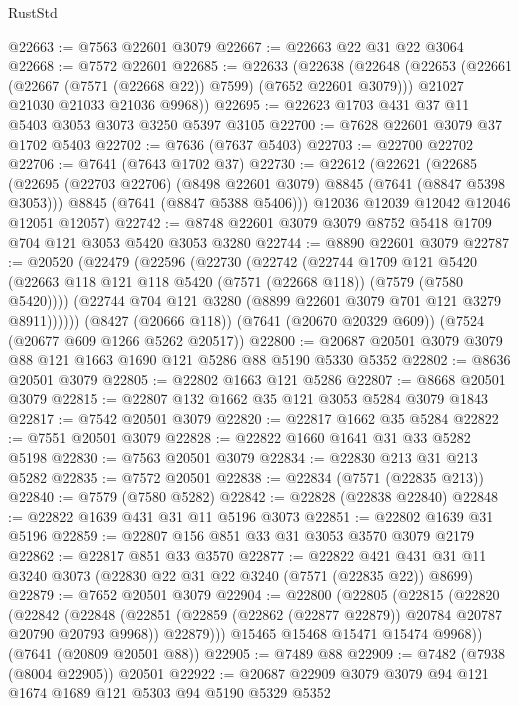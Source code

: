 \begin{lexlean}{RustStd}
\begin{coremodule}
{\begin{coremodule}
{{{{{{{{{{{{{{{{{{{{{{{{{{{{{{{{@22663 := @7563 @22601 @3079
@22667 := @22663 @22 @31 @22 @3064
@22668 := @7572 @22601
@22685 := @22633
    (@22638
      (@22648
        (@22653 (@22661 (@22667 (@7571 (@22668 @22)) @7599) (@7652 @22601 @3079)))
        @21027
        @21030
        @21033
        @21036
        @9968))
@22695 := @22623 @1703 @431 @37 @11 @5403 @3053 @3073 @3250 @5397 @3105
@22700 := @7628 @22601 @3079 @37 @1702 @5403
@22702 := @7636 (@7637 @5403)
@22703 := @22700 @22702
@22706 := @7641 (@7643 @1702 @37)
@22730 := @22612
    (@22621
      (@22685
        (@22695 (@22703 @22706) (@8498 @22601 @3079) @8845 (@7641 (@8847 @5398 @3053)))
        @8845
        (@7641 (@8847 @5388 @5406)))
      @12036
      @12039
      @12042
      @12046
      @12051
      @12057)
@22742 := @8748 @22601 @3079 @3079 @8752 @5418 @1709 @704 @121 @3053 @5420 @3053 @3280
@22744 := @8890 @22601 @3079
@22787 := @20520
    (@22479
      (@22596
        (@22730
          (@22742
            (@22744
              @1709
              @121
              @5420
              (@22663 @118 @121 @118 @5420 (@7571 (@22668 @118)) (@7579 (@7580 @5420))))
            (@22744 @704 @121 @3280 (@8899 @22601 @3079 @701 @121 @3279 @8911))))))
    (@8427 (@20666 @118))
    (@7641 (@20670 @20329 @609))
    (@7524 (@20677 @609 @1266 @5262 @20517))
@22800 := @20687 @20501 @3079 @3079 @88 @121 @1663 @1690 @121 @5286 @88 @5190 @5330 @5352
@22802 := @8636 @20501 @3079
@22805 := @22802 @1663 @121 @5286
@22807 := @8668 @20501 @3079
@22815 := @22807 @132 @1662 @35 @121 @3053 @5284 @3079 @1843
@22817 := @7542 @20501 @3079
@22820 := @22817 @1662 @35 @5284
@22822 := @7551 @20501 @3079
@22828 := @22822 @1660 @1641 @31 @33 @5282 @5198
@22830 := @7563 @20501 @3079
@22834 := @22830 @213 @31 @213 @5282
@22835 := @7572 @20501
@22838 := @22834 (@7571 (@22835 @213))
@22840 := @7579 (@7580 @5282)
@22842 := @22828 (@22838 @22840)
@22848 := @22822 @1639 @431 @31 @11 @5196 @3073
@22851 := @22802 @1639 @31 @5196
@22859 := @22807 @156 @851 @33 @31 @3053 @3570 @3079 @2179
@22862 := @22817 @851 @33 @3570
@22877 := @22822 @421 @431 @31 @11 @3240 @3073 (@22830 @22 @31 @22 @3240 (@7571 (@22835 @22)) @8699)
@22879 := @7652 @20501 @3079
@22904 := @22800
    (@22805
      (@22815
        (@22820
          (@22842
            (@22848
              (@22851 (@22859 (@22862 (@22877 @22879)) @20784 @20787 @20790 @20793 @9968))
              @22879)))
        @15465
        @15468
        @15471
        @15474
        @9968))
    (@7641 (@20809 @20501 @88))
@22905 := @7489 @88
@22909 := @7482 (@7938 (@8004 @22905)) @20501
@22922 := @20687 @22909 @3079 @3079 @94 @121 @1674 @1689 @121 @5303 @94 @5190 @5329 @5352
}}}}}}}}}}}}}}}}}}}}}}}}}}}}}}}}
\end{coremodule}}
\end{coremodule}
\end{lexlean}
